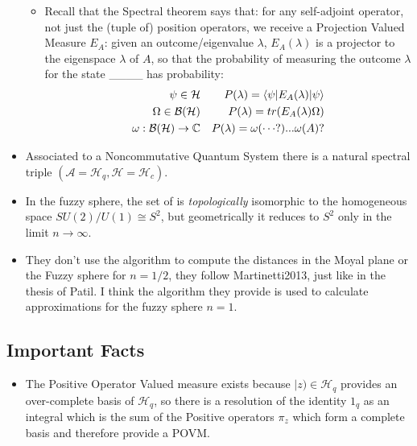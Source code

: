 \documentclass{article}
\begin{document}
\begin{itemize}
        \begin{itemize}
            
        \item Recall that the Spectral theorem says that: for any self-adjoint operator, not just the (tuple of) position operators, we receive a Projection Valued Measure $E_A$: given an outcome/eigenvalue $\lambda$, $E_A(\lambda)$ is a projector to the eigenspace $\lambda$ of $A$, so that the probability of measuring the outcome $\lambda$ for the state \_\_\_\_ has probability:
            \begin{align*}
                \psi \in \mathcal H &&P(\lambda) = \langle \psi | E_A(\lambda) |\psi \rangle \\
                \Omega \in \mathcal B(\mathcal H) &&P(\lambda) = tr(E_A(\lambda) \Omega)\\
                \omega: \mathcal B(\mathcal H) \to \mathbb{C} &&P(\lambda) = \omega(\cdots?)... \omega(A)?
            \end{align*}
            
        \end{itemize}
    
    \item Associated to a Noncommutative Quantum System there is a natural spectral triple $(\mathcal A = \mathcal H_q, \mathcal H = \mathcal H_c)$.
    
    \item In the fuzzy sphere, the set of  is \emph{topologically} isomorphic to the homogeneous space $SU(2)/U(1) \cong S^2$, but geometrically it reduces to $S^2$ only in the limit $n \to \infty$.
    
    \item They don't use the algorithm to compute the distances in the Moyal plane or the Fuzzy sphere for $n = 1/2$, they follow Martinetti2013, just like in the thesis of Patil. I think the algorithm they provide is used to calculate approximations for the fuzzy sphere $n = 1$.
    
    \end{itemize}

\subsection{Important Facts}

    \begin{itemize}

    \item The Positive Operator Valued measure exists because $|z) \in \mathcal H_q$ provides an over-complete basis of $\mathcal H_q$, so there is a resolution of the identity $1_{q}$ as an integral which is the sum of the Positive operators $\pi_z$ which form a complete basis  and therefore provide a POVM.
    
    \end{itemize}
\end{document}
